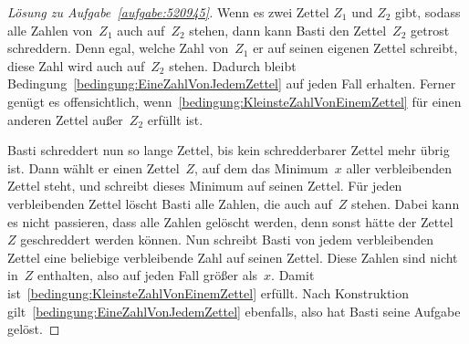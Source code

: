 \begin{proof}[Lösung zu Aufgabe~\ref{aufgabe:520945}]
	Wenn es zwei Zettel $Z_1$ und $Z_2$ gibt, sodass alle Zahlen von~$Z_1$ auch auf~$Z_2$ stehen, dann kann Basti den Zettel~$Z_2$ getrost schreddern. Denn egal, welche Zahl von~$Z_1$ er auf seinen eigenen Zettel schreibt, diese Zahl wird auch auf~$Z_2$ stehen. Dadurch bleibt Bedingung~\ref{bedingung:EineZahlVonJedemZettel} auf jeden Fall erhalten. Ferner genügt es offensichtlich, wenn~\ref{bedingung:KleinsteZahlVonEinemZettel} für einen anderen Zettel außer~$Z_2$ erfüllt ist.
	
	Basti schreddert nun so lange Zettel, bis kein schredderbarer Zettel mehr übrig ist. Dann wählt er einen Zettel~$Z$, auf dem das Minimum~$x$ aller verbleibenden Zettel steht, und schreibt dieses Minimum auf seinen Zettel. Für jeden verbleibenden Zettel löscht Basti alle Zahlen, die auch auf~$Z$ stehen. Dabei kann es nicht passieren, dass alle Zahlen gelöscht werden, denn sonst hätte der Zettel~$Z$ geschreddert werden können. Nun schreibt Basti von jedem verbleibenden Zettel eine beliebige verbleibende Zahl auf seinen Zettel. Diese Zahlen sind nicht in~$Z$ enthalten, also auf jeden Fall größer als~$x$. Damit ist~\ref{bedingung:KleinsteZahlVonEinemZettel} erfüllt. Nach Konstruktion gilt~\ref{bedingung:EineZahlVonJedemZettel} ebenfalls, also hat Basti seine Aufgabe gelöst.
\end{proof}

